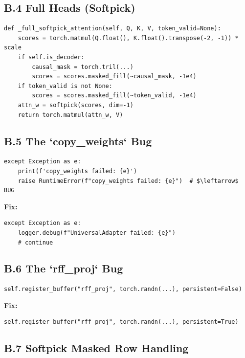\subsection{B.4 Full Heads (Softpick)}

\begin{lstlisting}
def _full_softpick_attention(self, Q, K, V, token_valid=None):
    scores = torch.matmul(Q.float(), K.float().transpose(-2, -1)) * scale
    if self.is_decoder:
        causal_mask = torch.tril(...)
        scores = scores.masked_fill(~causal_mask, -1e4)
    if token_valid is not None:
        scores = scores.masked_fill(~token_valid, -1e4)
    attn_w = softpick(scores, dim=-1)
    return torch.matmul(attn_w, V)
\end{lstlisting}

\subsection{B.5 The `copy\_weights` Bug}

\begin{lstlisting}
except Exception as e:
    print(f'copy_weights failed: {e}')
    raise RuntimeError(f"copy_weights failed: {e}")  # $\leftarrow$ BUG
\end{lstlisting}

\textbf{Fix:}

\begin{lstlisting}
except Exception as e:
    logger.debug(f"UniversalAdapter failed: {e}")
    # continue
\end{lstlisting}

\subsection{B.6 The `rff\_proj` Bug}

\begin{lstlisting}
self.register_buffer("rff_proj", torch.randn(...), persistent=False)
\end{lstlisting}

\textbf{Fix:}

\begin{lstlisting}
self.register_buffer("rff_proj", torch.randn(...), persistent=True)
\end{lstlisting}

\subsection{B.7 Softpick Masked Row Handling}

